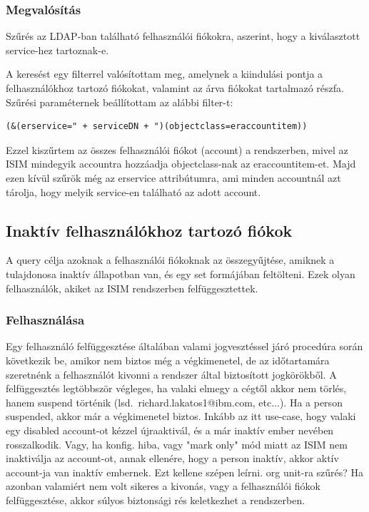 	\subsubsection{Megvalósítás}
		Szűrés az LDAP-ban található felhasználói fiókokra, aszerint, hogy a kiválasztott service-hez tartoznak-e.
		
		A keresést egy filterrel valósítottam meg, amelynek a kiindulási pontja a felhasználókhoz tartozó fiókokat, valamint az árva fiókokat tartalmazó részfa. Szűrési paraméternek beállítottam az alábbi filter-t: 
\begin{lstlisting}
(&(erservice=" + serviceDN + ")(objectclass=eraccountitem))
\end{lstlisting}
	Ezzel kiszűrtem az összes felhasználói fiókot (account) a rendszerben, mivel az ISIM mindegyik accountra hozzáadja objectclass-nak az eraccountitem-et. Majd ezen kívül szűrök még az erservice attribútumra, ami minden accountnál azt tárolja, hogy melyik service-en található az adott account.
	
	
\subsection{Inaktív felhasználókhoz tartozó fiókok}
	A query célja azoknak a felhasználói fiókoknak az összegyűjtése, amiknek a tulajdonosa inaktív állapotban van, és egy set formájában feltölteni. Ezek olyan felhasználók, akiket az ISIM rendszerben felfüggesztettek.
	\subsubsection{Felhasználása}
		Egy felhasználó felfüggesztése általában valami jogvesztéssel járó procedúra során következik be, amikor nem biztos még a végkimenetel, de az időtartamára szeretnénk a felhasználót kivonni a rendszer által biztosított jogkörökből. 
\laci A felfüggesztés legtöbbször végleges, ha valaki elmegy a cégtől akkor nem törlés, hanem suspend történik (lsd.~richard.lakatos1@ibm.com, etc...). Ha a person suspended, akkor már a végkimenetel biztos. Inkább az itt use-case, hogy valaki egy disabled account-ot kézzel újraaktivál, és a már inaktív ember nevében rosszalkodik. Vagy, ha konfig. hiba, vagy "mark only" mód miatt az ISIM nem inaktiválja az account-ot, annak ellenére, hogy a person inaktív, akkor aktív account-ja van inaktív embernek. Ezt kellene szépen leírni.
\laci org unit-ra szűrés?
		Ha azonban valamiért nem volt sikeres a kivonás, vagy a felhasználói fiókok felfüggesztése, akkor súlyos biztonsági rés keletkezhet a rendszerben.

